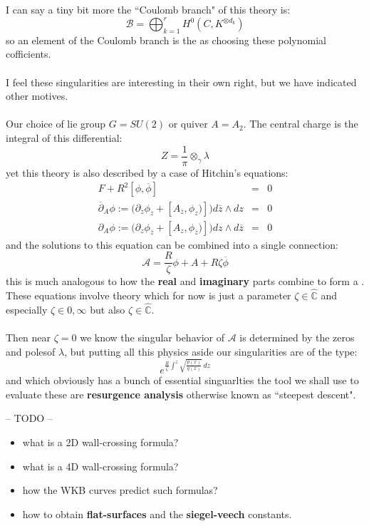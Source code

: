 \documentclass[12pt]{article}
\begin{document}
\noindent I can say a tiny bit more the ``Coulomb branch" of this theory is:
$$ \mathcal{B} = \bigoplus_{k=1}^r H^0(C, K^{\otimes d_k}) $$
so an element of the Coulomb branch is the as choosing these polynomial cofficients.  \\ \\
I feel these singularities are interesting in their own right, but we have indicated other motives.  \\ \\
Our choice of lie group $G = SU(2)$ or quiver $A = A_2$.  The central charge is the integral of this differential:
$$ Z = \frac{1}{\pi} \otimes_\gamma \lambda $$
yet this theory is also described by a case of Hitchin's equations:
\begin{eqnarray}
F + R^2 [ \phi, \overline{\phi}] &=& 0 \\
\overline{\partial}_A \phi := \big( \partial_{\overline{z}} \phi_z + [A_{\overline{z}}, \phi_z)] \big) d\overline{z} \wedge dz &=& 0 \\
\partial_A \phi := \big( \partial_z \phi_{\overline{z}} + [A_z, \phi_{\overline{z}})] \big) dz \wedge d\overline{z}&=& 0 
\end{eqnarray}
and the solutions to this equation can be combined into a single connection:
$$ \mathcal{A} = \frac{R}{\zeta} \phi + A + R \zeta \overline{\phi} $$
this is much analogous to how the \textbf{real} and \textbf{imaginary} parts combine to form a \textbf{\color{blue!50!white}{complex number}}.  These equations involve {\color{red!50!white}{twistor}} theory which for now is just a parameter $\zeta \in \hat{\mathbb{C}}$ and especially $\zeta \in {0, \infty}$ but also $\zeta \in \hat{\mathbb{C}}$. \\ \\
Then near $\zeta = 0$ we know the singular behavior of $\mathcal{A}$ is determined by the zeros and polesof $\lambda$, but putting all this physics aside our singularities are of the type:
$$ e^{ \frac{R}{\zeta} \int^z \sqrt{\frac{p(x)}{q(x)}} \, dz} $$
and which obviously has a bunch of essential singuarlties the tool we shall use to evaluate these are \textbf{resurgence analysis} otherwise known as ``steepest descent".

\newpage

\noindent -- TODO -- 

\begin{itemize}
\item what is a 2D wall-crossing formula?
\item what is a 4D wall-crossing formula?
\item how the WKB curves predict such formulas?

\item how to obtain \textbf{flat-surfaces} and the \textbf{siegel-veech} constants.
\end{itemize}
\end{document}
